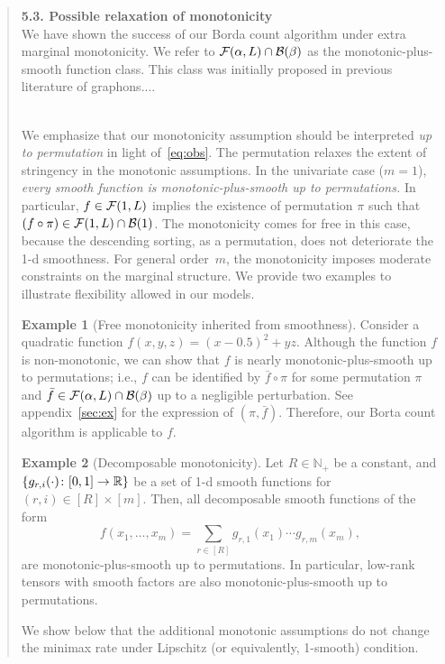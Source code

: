 \documentclass[11pt]{article}
\theoremstyle{plain}
\theoremstyle{definition}
\newtheorem{example}{Example}
\begin{document}
\begin{enumerate}[wide, labelwidth=!, labelindent=0pt]
\begin{quote}
{{\bf 5.3. Possible relaxation of monotonicity} \\

We have shown the success of our Borda count algorithm under extra marginal monotonicity. We refer to $\mathcal{F}(\alpha,L)\cap \mathcal{B}(\beta)$ as the monotonic-plus-smooth function class. This class was initially proposed in previous literature of graphons....\\\

We emphasize that our monotonicity assumption should be interpreted \emph{up to permutation} in light of~\eqref{eq:obs}. The permutation relaxes the extent of stringency in the monotonic assumptions. In the univariate case ($m=1$), \emph{every smooth function is monotonic-plus-smooth up to permutations.} In particular, $f\in \mathcal{F}(1, L)$ implies the existence of permutation $\pi$ such that $(f\circ \pi) \in \mathcal{F}(1, L)\cap \mathcal{B}(1)$. The monotonicity comes for free in this case, because the descending sorting, as a permutation, does not deteriorate the 1-d smoothness. For general order~$m$, the monotonicity imposes moderate constraints on the marginal structure. We provide two examples to illustrate flexibility allowed in our models.  \\
  
 
 \begin{example}[Free monotonicity inherited from smoothness]\label{ex:free}Consider a quadratic function $f(x,y,z)=(x-0.5)^2+yz$. Although the function $f$ is non-monotonic, we can show that $f$ is nearly monotonic-plus-smooth up to permutations; i.e., $f$ can be identified by $\bar f\circ \pi$ for some permutation $\pi$ and $\bar f \in \mathcal{F}(\alpha,L)\cap \mathcal{B}(\beta)$ up to a negligible perturbation. See appendix~\ref{sec:ex} for the expression of $(\pi, \bar f)$. Therefore, our Borta count algorithm is applicable to $f$.  
 \end{example}
 
 
  \begin{example}[Decomposable monotonicity] Let $R\in\mathbb{N}_{+}$ be a constant, and $\{g_{r,i}(\cdot) \colon[0,1]\to \mathbb{R}\}$ be a set of 1-d smooth functions for $(r,i)\in[R]\times [m]$. Then, all decomposable smooth functions of the form 
  \[
  f(x_1,\ldots,x_m)=\sum_{r\in[R]}g_{r,1}(x_1)\cdots g_{r,m}(x_m),
  \]
are monotonic-plus-smooth up to permutations. In particular, low-rank tensors with smooth factors are also monotonic-plus-smooth up to permutations.
\end{example}

We show below that the additional monotonic assumptions do not change the minimax rate under Lipschitz (or equivalently, 1-smooth) condition. 

}
\end{quote}
\end{enumerate}
\end{document}
